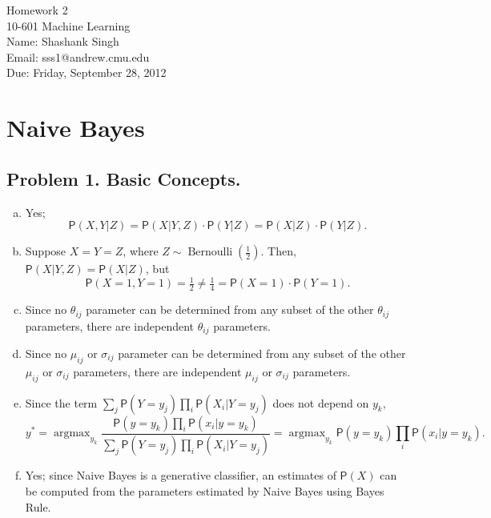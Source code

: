 \documentclass[11pt]{article}
\makeatletter
\newcommand{\myname}{Shashank Singh}
\newcommand{\myandrew}{sss1@andrew.cmu.edu}
\newcommand{\myclass}{10-601 Machine Learning}
\newcommand{\myhwnum}{2}
\newcommand{\duedate}{Friday, September 28, 2012}
\newcommand{\pr}[1]{\mathsf{P}\left( #1 \right)} %
\newcommand{\Bern}[1]{\operatorname{Bernoulli}\left( #1 \right)} %
\newcommand{\argmax}{\operatorname{argmax}}
\makeatother
\begin{document}
\thispagestyle{plain}

{\Large Homework \myhwnum} \\
\myclass \\
Name: \myname \\
Email: \myandrew \\
Due: \duedate \\

\section{Naive Bayes}
\subsection*{Problem 1. Basic Concepts.}
\begin{enumerate}[a.]
\item Yes;
\[\pr{X,Y | Z} = \pr{X | Y,Z} \cdot \pr{Y | Z} = \pr{X | Z} \cdot \pr{Y | Z}.\]

\item Suppose $X = Y = Z$, where $Z \sim \Bern{\tfrac12}$. Then,
$\pr{X | Y,Z} = \pr{X | Z}$, but
\[\pr{X = 1, Y = 1} = \tfrac12 \neq \tfrac14 = \pr{X = 1} \cdot \pr{Y = 1}.\]

\item Since no $\theta_{ij}$ parameter can be determined from any subset of
the other $\theta_{ij}$ parameters, there are  independent
$\theta_{ij}$ parameters.

\item Since no $\mu_{ij}$ or $\sigma_{ij}$ parameter can be determined from
any subset of the other $\mu_{ij}$ or $\sigma_{ij}$ parameters, there are
 independent $\mu_{ij}$ or $\sigma_{ij}$ parameters.

\item Since the term $\sum_j \pr{Y = y_j} \prod_i \pr{X_i | Y = y_j}$ does not
depend on $y_k$,
\[y^*
 = \argmax_{y_k} \frac{\pr{y = y_k} \prod_i \pr{x_i | y = y_k}}
           {\sum_j \pr{Y = y_j} \prod_i \pr{X_i | Y = y_j}}
 = \argmax_{y_k} \pr{y = y_k} \prod_i \pr{x_i | y = y_k}.
\]

\item Yes; since Naive Bayes is a generative classifier, an estimates of
$\pr{X}$ can be computed from the parameters estimated by Naive Bayes using
Bayes Rule.
\end{enumerate}
\end{document}
